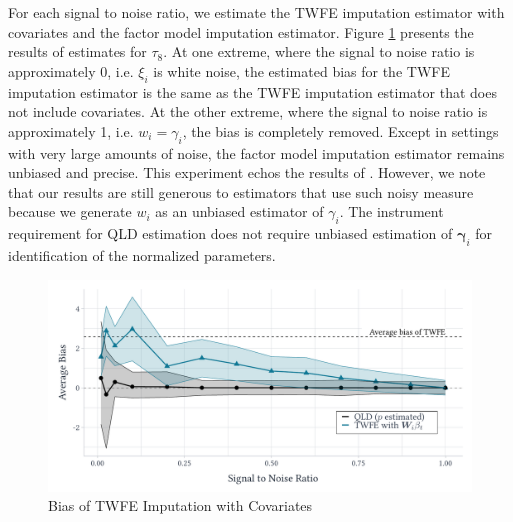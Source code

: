 \documentclass[12pt]{article}
\begin{document}
For each signal to noise ratio, we estimate the TWFE imputation estimator with covariates and the factor model imputation estimator. Figure \ref{fig:noisy_w} presents the results of estimates for $\tau_8$. At one extreme, where the signal to noise ratio is approximately 0, i.e. $\xi_i$ is white noise, the estimated bias for the TWFE imputation estimator is the same as the TWFE imputation estimator that does not include covariates. At the other extreme, where the signal to noise ratio is approximately 1, i.e. $w_i = \gamma_i$, the bias is completely removed. Except in settings with very large amounts of noise, the factor model imputation estimator remains unbiased and precise. This experiment echos the results of \citet{kejriwal2024efficacy}. However, we note that our results are still generous to estimators that use such noisy measure because we generate $w_i$ as an unbiased estimator of $\gamma_i$. The instrument requirement for QLD estimation does not require unbiased estimation of $\bm \gamma_i$ for identification of the normalized parameters.

\begin{figure}
  \begin{adjustbox}{width=.8\textwidth, center}
    \includegraphics{figures/simulation-2/bias_signal_to_noise.pdf}
  \end{adjustbox}
  \caption{Bias of TWFE Imputation with Covariates}\label{fig:noisy_w}

\end{figure}
\end{document}
